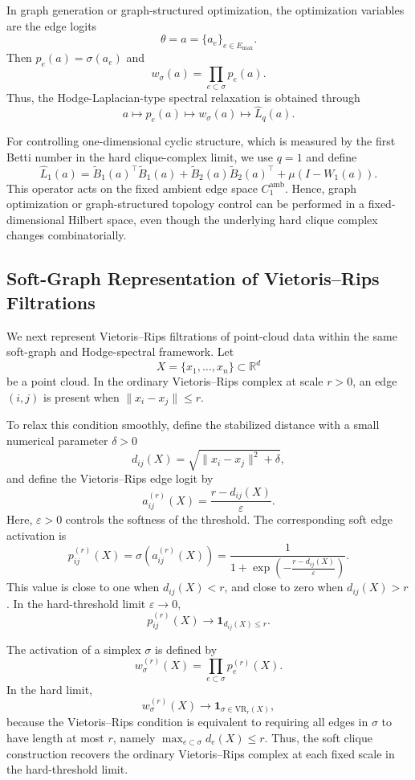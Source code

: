 \documentclass[pdflatex,sn-mathphys-ay]{sn-jnl}%
\theoremstyle{thmstyleone}%
\theoremstyle{thmstyletwo}%
\theoremstyle{thmstylethree}%
\begin{document}
In graph generation or graph-structured optimization, the optimization variables are the edge logits
\[
\theta=a=\{a_e\}_{e\in E_{\max}}.
\]
Then \(p_e(a)=\sigma(a_e)\) and
\[
w_\sigma(a)=\prod_{e\subset\sigma}p_e(a).
\]
Thus, the Hodge-Laplacian-type spectral relaxation is obtained through
\[
a
\longmapsto
p_e(a)
\longmapsto
w_\sigma(a)
\longmapsto
\widehat{L}_q(a).
\]

For controlling one-dimensional cyclic structure, which is measured by the first Betti number in the hard clique-complex limit, we use \(q=1\) and define
\[
\widehat{L}_1(a)
=
\widetilde{B}_1(a)^\top
\widetilde{B}_1(a)
+
\widetilde{B}_2(a)
\widetilde{B}_2(a)^\top
+
\mu(I-W_1(a)).
\]
This operator acts on the fixed ambient edge space \(C_1^{\mathrm{amb}}\). Hence, graph optimization or graph-structured topology control can be performed in a fixed-dimensional Hilbert space, even though the underlying hard clique complex changes combinatorially.

\subsection{Soft-Graph Representation of Vietoris--Rips Filtrations}

We next represent Vietoris--Rips filtrations of point-cloud data within the same soft-graph and Hodge-spectral framework. Let
\[
X=\{x_1,\ldots,x_n\}\subset\mathbb{R}^d
\]
be a point cloud. In the ordinary Vietoris--Rips complex at scale \(r>0\), an edge \((i,j)\) is present when \(\|x_i-x_j\|\le r\).

To relax this condition smoothly, define the stabilized distance with a small numerical parameter \(\delta>0\)
\[
d_{ij}(X)
=
\sqrt{
\|x_i-x_j\|^2+\delta
},
\]
and define the Vietoris--Rips edge logit by
\[
a_{ij}^{(r)}(X)
=
\frac{r-d_{ij}(X)}{\varepsilon}.
\]
Here, \(\varepsilon>0\) controls the softness of the threshold. The corresponding soft edge activation is
\[
p_{ij}^{(r)}(X)
=
\sigma\left(a_{ij}^{(r)}(X)\right)
=
\frac{1}{1+\exp\left(-\frac{r-d_{ij}(X)}{\varepsilon}\right)}.
\]
This value is close to one when \(d_{ij}(X)<r\), and close to zero when \(d_{ij}(X)>r\). In the hard-threshold limit \(\varepsilon\to 0\),
\[
p_{ij}^{(r)}(X)
\to
\mathbf{1}_{d_{ij}(X)\le r}.
\]

The activation of a simplex \(\sigma\) is defined by
\[
w_\sigma^{(r)}(X)
=
\prod_{e\subset\sigma}
p_e^{(r)}(X).
\]
In the hard limit,
\[
w_\sigma^{(r)}(X)
\to
\mathbf{1}_{\sigma\in \mathrm{VR}_r(X)},
\]
because the Vietoris--Rips condition is equivalent to requiring all edges in \(\sigma\) to have length at most \(r\), namely \(\max_{e\subset\sigma}d_e(X)\le r\).
Thus, the soft clique construction recovers the ordinary Vietoris--Rips complex at each fixed scale in the hard-threshold limit.
\end{document}
